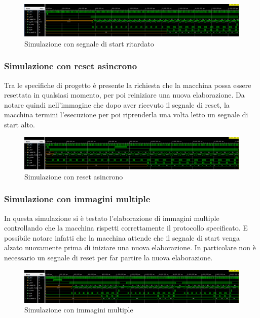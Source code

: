 \documentclass{article}
\begin{document}
\begin{figure}[h]
    \includegraphics[width=\textwidth]{test-delayed-start.png}
    \centering
    \caption{Simulazione con segnale di start ritardato}
\end{figure}

\pagebreak

\subsubsection{Simulazione con reset asincrono}
Tra le specifiche di progetto è presente la richiesta che la macchina possa essere resettata in qualsiasi momento, per poi reiniziare una nuova elaborazione. Da notare quindi nell'immagine che dopo aver ricevuto il segnale di reset, la macchina termini l'esecuzione per poi riprenderla una volta letto un segnale di start alto.

\begin{figure}[h]
    \includegraphics[width=\textwidth]{test-async-reset.png}
    \centering
    \caption{Simulazione con reset asincrono}
\end{figure}

\subsubsection{Simulazione con immagini multiple}

In questa simulazione si è testato l'elaborazione di immagini multiple controllando che la macchina rispetti correttamente il protocollo specificato. E possibile notare infatti che la macchina attende che il segnale di start venga alzato nuovamente prima di iniziare una nuova elaborazione. In particolare non è necessario un segnale di reset per far partire la nuova elaborazione.

\begin{figure}[h]
    \includegraphics[width=\textwidth]{test-multiple-images.png}
    \centering
    \caption{Simulazione con immagini multiple}
\end{figure}
\end{document}
